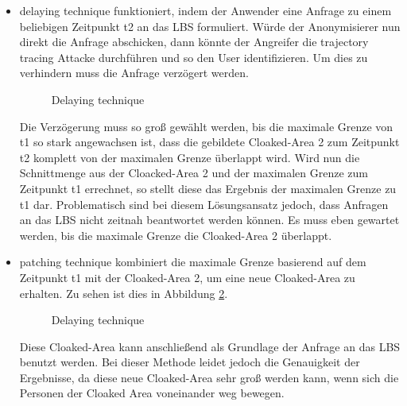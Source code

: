 \begin{itemize} 
\item{delaying technique} funktioniert, indem der Anwender eine Anfrage zu einem beliebigen Zeitpunkt t2 an das LBS formuliert. Würde der Anonymisierer nun direkt die Anfrage abschicken, dann könnte der Angreifer die trajectory tracing Attacke durchführen und so den User identifizieren. Um dies zu verhindern muss die Anfrage verzögert werden. 
\begin{figure}[!h]
		\centering
		\caption{Delaying technique}
		\label{fig_chow2011_delaying-tech}
\end{figure}
Die Verzögerung muss so groß gewählt werden, bis die maximale Grenze von t1 so stark angewachsen ist, dass die gebildete Cloaked-Area 2 zum Zeitpunkt t2 komplett von der maximalen Grenze überlappt wird. Wird nun die Schnittmenge aus der Cloacked-Area 2 und der maximalen Grenze zum Zeitpunkt t1 errechnet, so stellt diese das Ergebnis der maximalen Grenze zu t1 dar. Problematisch sind bei diesem Lösungsansatz jedoch, dass Anfragen an das LBS nicht zeitnah beantwortet werden können. Es muss eben gewartet werden, bis die maximale Grenze die Cloaked-Area 2 überlappt. 
\item{patching technique} kombiniert die maximale Grenze basierend auf dem Zeitpunkt t1 mit der Cloaked-Area 2, um eine neue Cloaked-Area zu erhalten. Zu sehen ist dies in Abbildung \ref{fig_chow2011_patching-tech}.
\begin{figure}[!h]
		\centering
		\caption{Delaying technique}
		\label{fig_chow2011_patching-tech}
\end{figure}
Diese Cloaked-Area kann anschließend als Grundlage der Anfrage an das LBS benutzt werden. Bei dieser Methode leidet jedoch die Genauigkeit der Ergebnisse, da diese neue Cloaked-Area sehr groß werden kann, wenn sich die Personen der Cloaked Area voneinander weg bewegen.  
\end{itemize} 
